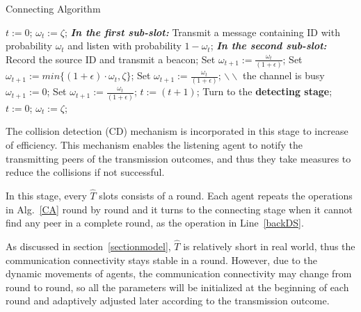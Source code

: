 \begin{algorithm}[ht]
    \caption{Connecting Algorithm}
    \label{CA}
    \begin{algorithmic}[1]
    \STATE $t := 0$; $\omega_t := \zeta$; 
        \STATE \textbf{\emph{In the first sub-slot:}}
        \STATE Transmit a message containing ID with probability $\omega_t$
        and listen with probability $1-\omega_t$;
        \STATE \textbf{\emph{In the second sub-slot:}}
                \STATE Record the source ID and transmit a beacon;
                \STATE Set $\omega_{t+1} := \frac{\omega_t}{(1+\epsilon)}$;
                \STATE Set $\omega_{t+1} := min\{(1+\epsilon)\cdot\omega_t, \zeta\}$;
            \ELSE
                \STATE Set $\omega_{t+1} := \frac{\omega_t}{(1+\epsilon)}$; $\backslash\backslash$ the channel is busy
            \ENDIF
        \ELSE
                \STATE $\omega_{t+1} := 0$;
            \ELSE
                \STATE Set $\omega_{t+1} := \frac{\omega_t}{(1+\epsilon)}$;
            \ENDIF
        \ENDIF
        \STATE $t := (t + 1)$;
                \STATE Turn to the \textbf{detecting stage}; \label{backDS}
            \ELSE
                \STATE $t := 0$; $\omega_t := \zeta$;
            \ENDIF
        \ENDIF
    \ENDWHILE
    \end{algorithmic}
\end{algorithm}



The collision detection (CD) mechanism is incorporated in this stage 
to increase of efficiency. This mechanism enables the listening agent 
to notify the transmitting peers of the transmission outcomes, 
and thus they take measures to reduce the collisions if not successful.

In this stage, every $\hat{T}$ slots consists of a round. Each 
agent repeats the operations in Alg.~\ref{CA} round by round and 
it turns to the connecting stage when it cannot find any peer in a complete round, 
as the operation in Line~\ref{backDS}.

As discussed in section~\ref{sectionmodel}, $\hat{T}$ is relatively short in 
real world, thus the communication connectivity stays stable in a round. 
However, due to the dynamic movements of agents, the communication connectivity
may change from round to round, so all the parameters will be 
initialized at the beginning of each round and adaptively adjusted later 
according to the transmission outcome.

